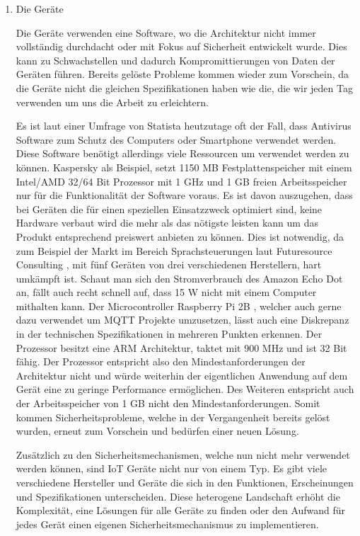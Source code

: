     \begin{enumerate}
        \item Die Geräte
        
        Die Geräte verwenden eine Software, wo die Architektur nicht immer vollständig durchdacht oder mit Fokus auf Sicherheit entwickelt wurde. Dies kann zu Schwachstellen und dadurch Kompromittierungen von Daten der Geräten führen. Bereits gelöste Probleme kommen wieder zum Vorschein, da die Geräte nicht die gleichen Spezifikationen haben wie die, die wir jeden Tag verwenden um uns die Arbeit zu erleichtern. 
    
        Es ist laut einer Umfrage von Statista \cite{kaspersky_lab_2019}
        heutzutage oft der Fall, dass Antivirus Software zum Schutz des Computers oder Smartphone verwendet werden. Diese Software benötigt allerdings viele Ressourcen um verwendet werden zu können.
        Kaspersky \cite{ao_kaspersky_lab_2018_1}
        als Beispiel, setzt 1150 MB Festplattenspeicher mit einem Intel/AMD 32/64 Bit Prozessor mit 1 GHz und 1 GB freien Arbeitsspeicher nur für die Funktionalität der Software voraus. Es ist davon auszugehen, dass bei Geräten die für einen speziellen Einsatzzweck optimiert sind, keine Hardware verbaut wird die mehr als das nötigste leisten kann um das Produkt entsprechend preiswert anbieten zu können. Dies ist notwendig, da zum Beispiel der Markt im Bereich Sprachsteuerungen laut Futuresource Consulting \cite{futuresource_consulting_ltd_2019}, mit fünf Geräten von drei verschiedenen Herstellern, hart umkämpft ist. Schaut man sich den Stromverbrauch des Amazon Echo Dot \cite{amazon_de_alle_produkte_2018} an, fällt auch recht schnell auf, dass 15 W nicht mit einem Computer mithalten kann. 
        Der Microcontroller Raspberry Pi 2B \cite{raspberry_pi_foundation_2016}, welcher auch gerne dazu verwendet um \ac{MQTT} Projekte umzusetzen, lässt auch eine Diskrepanz in der technischen Spezifikationen in mehreren Punkten erkennen. Der Prozessor besitzt eine ARM Architektur, taktet mit 900 MHz 
        und ist 32 Bit fähig. Der Prozessor entspricht also den Mindestanforderungen der Architektur nicht und würde weiterhin der eigentlichen Anwendung auf dem Gerät eine zu geringe Performance ermöglichen. Des Weiteren entspricht auch der Arbeitsspeicher von 1 GB nicht den Mindestanforderungen.
        Somit kommen Sicherheitsprobleme, welche in der Vergangenheit bereits gelöst wurden, erneut zum Vorschein und bedürfen einer neuen Lösung.
        
        Zusätzlich zu den Sicherheitsmechanismen, welche nun nicht mehr verwendet werden können, sind \ac{IoT} Geräte nicht nur von einem Typ. Es gibt viele verschiedene Hersteller und Geräte die sich in den Funktionen, Erscheinungen und Spezifikationen unterscheiden. Diese heterogene Landschaft erhöht die Komplexität, eine Lösungen für alle Geräte zu finden oder den Aufwand für jedes Gerät einen eigenen Sicherheitsmechanismus zu implementieren.
        

\end{enumerate}
